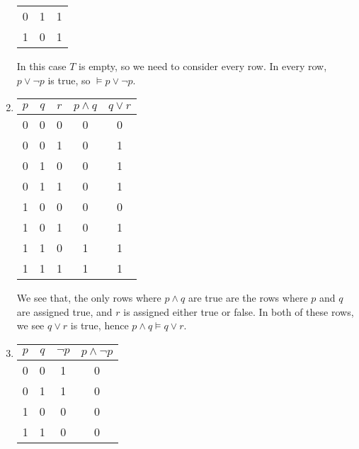 \documentclass[11pt]{article}
\begin{document}
\begin{answer}
\begin{enumerate}
\begin{tabular}{|c|c|c|}
            \rowcolor{green!40}0 & 1 & 1  \\
            \rowcolor{green!40}1 & 0 & 1\\ \hline
        \end{tabular}
        \quad
        \begin{minipage}{0.5\textwidth}
            In this case $T$ is empty, so we need to consider every row. In every row, $p \lor \neg p$ is true, so $\vDash p \lor \neg p$.
        \end{minipage}
        \item 
        \begin{tabular}{|c|c|c|c|c|}
            \hline
            $p$ & $q$ & $r$ & \cellcolor{blue!40}$p \land q$ & \cellcolor{yellow!40}$q \lor r$\\
            \hline \hline
            0 & 0 & 0 &0&0\\
            0 & 0 & 1 &0&1\\
            0 & 1 & 0 &0&1\\
            0 & 1 & 1 &0&1\\
            1 & 0 & 0 &0&0\\
            1 & 0 & 1 &0&1\\
            \rowcolor{green!40}1 & 1 & 0 &1&1\\
            \rowcolor{green!40}1 & 1 & 1 &1&1\\
            \hline
        \end{tabular} 
        \quad 
        \begin{minipage}{0.5\textwidth}
            We see that, the only rows where $p \land q$ are true are the rows where $p$ and $q$ are assigned true, and $r$ is assigned either true or false. In both of these rows, we see $q \lor r$ is true, hence $p \land q \vDash q \lor r$.
        \end{minipage}
        \item 
        \begin{tabular}{|c|c|c|c|}
            \hline
            $p$ & \cellcolor{yellow!40}$q$ & $\neg p$ & \cellcolor{blue!40}$p \land \neg p$\\
            \hline \hline
            0 & 0 & 1 &0 \\
            0 & 1 & 1 &0\\
            1 & 0 & 0 &0\\
            1 & 1 & 0 &0\\
            \hline
        \end{tabular} 
        \quad 
        \begin{minipage}{0.5\textwidth}

\end{minipage}
\end{enumerate}
\end{answer}
\end{document}
